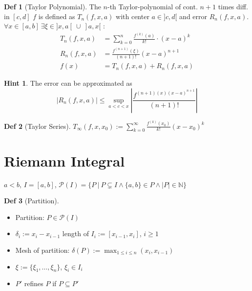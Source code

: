 \documentclass[a4paper, 10pt]{article}
\theoremstyle{definition}
\newtheorem*{definition}{Def}
\newtheorem*{note_wrapper}{Hint}
\theoremstyle{named}
\newenvironment{note}%
    {\begin{mdframed}[style=trick]\begin{note_wrapper}}%
    {\end{note_wrapper}\end{mdframed}}
\newcommand{\N}{\mathbb{N}}
\begin{document}
\begin{definition}[Taylor Polynomial]
    The $n$-th Taylor-polynomial of cont. $n + 1$ times diff. in $[c, d]$ $f$ is defined as $T_n(f, x, a)$ with center $a \in ]c, d[$ and error $R_n(f, x, a)$. \\ 
    $\forall x \in [a, b] \ \exists \xi \in ]x, a[ \ \cup \ ]a, x[$ : 
    \begin{align*}
        T_n(f, x, a) &= \sum_{k = 0}^n \frac{f^{(k)}(a)}{k!} \cdot (x - a)^k \\
        R_n(f, x, a) &= \frac{f^{(n+1)}(\xi)}{(n + 1)!}(x-a)^{n+1} \\
        f(x) &= T_n(f, x, a) + R_n(f, x, a)
    \end{align*}
\end{definition}

\begin{note}
    The error can be approximated as
    $$|R_n(f, x, a)| \leq \sup_{a < c < x}\left|\frac{f^{(n + 1)(x)(x-a)^{n+1}}}{(n+1)!}\right|$$
\end{note}

\begin{definition}[Taylor Series]
    $T_\infty(f, x, x_0) := \sum_{k = 0}^\infty \frac{f^{(k)}(x_0)}{k!}(x-x_0)^k$
\end{definition}

\section{Riemann Integral}
\begin{center}
    $a < b$, $I = [a, b]$, $\mathcal{P}(I) = \{P \ | \ P \subsetneq I \land \{a, b\} \in P \land |P| \in \N \}$
\end{center}
\begin{definition}[Partition]
    \begin{itemize}
        \item Partition:  $P \in \mathcal{P}(I)$
        \item $\delta_i := x_i - x_{i-1}$ length of $I_i := [x_{i-1}, x_i]$, $i \geq 1$
        \item Mesh of partition: $\delta(P) := \max_{1 \leq i \leq n}(x_i, x_{i - 1})$
        \item $\xi := \{\xi_1, \ldots, \xi_n\}$, $\xi_i \in I_i$
        \item $P'$ refines $P$ if $P \subseteq   P'$
    \end{itemize}
\end{definition}
\end{document}
